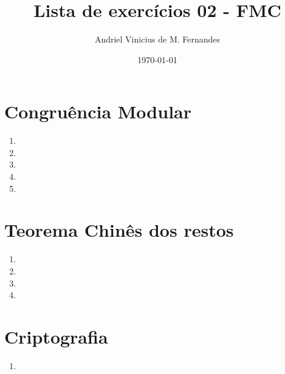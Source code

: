 \documentclass[12pt]{article}
\title{Lista de exercícios 02 - FMC}
\author{Andriel Vinicius de M. Fernandes}
\date{\today}
\begin{document}
\maketitle
\section{Congruência Modular}
\begin{enumerate}
	\item 
	\item 
	\item 
	\item 
	\item 
\end{enumerate}
\section{Teorema Chinês dos restos}
\begin{enumerate}
	\item 
	\item 
	\item 
	\item 
\end{enumerate}
\section{Criptografia}
\begin{enumerate}
	\item 
\end{enumerate}
\end{document}
